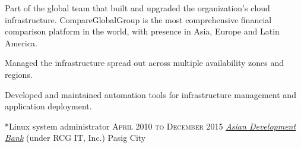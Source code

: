 \documentclass[10pt, a4paper, final]{article}
\begin{document}
\begin{section}
\begin{subsection}
    Part of the global team that built and upgraded the organization's cloud infrastructure. CompareGlobalGroup is the most comprehensive financial comparison platform in the world, with presence in Asia, Europe and Latin America.
    \vspace{1em}
    \begin{compactitem}
      \item Managed the infrastructure spread out across multiple availability zones and regions.
      \item Developed and maintained automation tools for infrastructure management and application deployment.
      
    \end{compactitem}
  \end{subsection}
  \vspace{2em}

  \begin{subsection}*{Linux system administrator \hfill\textsc{April 2010 to December 2015}}
    \href{http://www.adb.org}{\textit{Asian Development Bank}} (under RCG IT, Inc.) \hfill Pasig City
    \vspace{1em}


\end{subsection}
\end{section}
\end{document}
